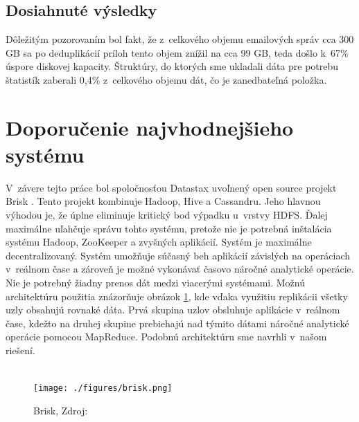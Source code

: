 \documentclass[11pt,twoside,a4paper]{book}
\begin{document}
\subsection*{Dosiahnuté výsledky}
Dôležitým pozorovaním bol fakt, že z~celkového objemu emailových správ cca 300 GB sa po deduplikácií príloh tento objem znížil na cca 99 GB, teda došlo k~67\% úspore diskovej kapacity. Štruktúry, do ktorých sme ukladali dáta pre potrebu štatistík zaberali 0,4\% z~celkového objemu dát, čo je zanedbateľná položka.

\noindent

\section{Doporučenie najvhodnejšieho systému}
V~závere tejto práce bol spoločnosťou Datastax uvoľnený open source projekt Brisk \cite{brisk}. Tento projekt kombinuje Hadoop, Hive a Cassandru. Jeho hlavnou výhodou je, že úplne eliminuje kritický bod výpadku u~vrstvy HDFS. Ďalej maximálne uľahčuje správu tohto systému, pretože nie je potrebná inštalácia systému Hadoop, ZooKeeper a zvyšných aplikácií. Systém je maximálne decentralizovaný. Systém umožňuje súčasný beh aplikácií závislých na operáciach v~reálnom čase a zároveň je možné vykonávať časovo náročné analytické operácie. Nie je potrebný žiadny prenos dát medzi viacerými systémami. Možnú architektúru použitia znázorňuje obrázok \ref{fig:brisk}, kde vďaka využitiu replikácii všetky uzly obsahujú rovnaké dáta. Prvá skupina uzlov obsluhuje aplikácie v~reálnom čase, kdežto na druhej skupine prebiehajú nad týmito dátami náročné analytické operácie pomocou MapReduce. Podobnú architektúru sme navrhli v~našom riešení. \\
\\

\begin{figure}[h]
 \centering
 \texttt{[image: ./figures/brisk.png]}
 \caption{Brisk, Zdroj: \cite{briskPic}}
 \label{fig:brisk}
\end{figure}


\end{document}
